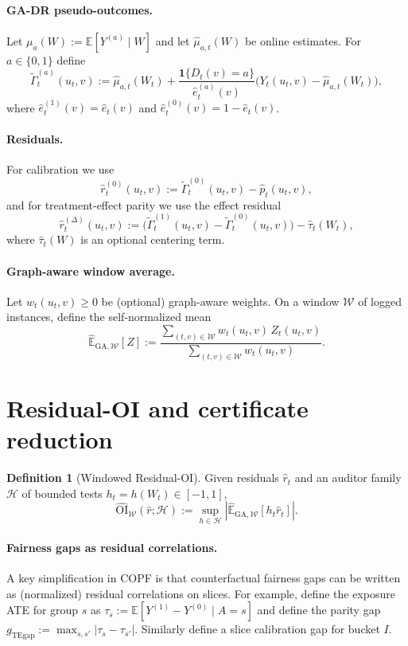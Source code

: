 \documentclass[11pt]{article}
\newcommand{\E}{\mathbb{E}}
\newcommand{\1}{\mathbf{1}}
\newcommand{\cH}{\mathcal{H}}
\newcommand{\cW}{\mathcal{W}}
\newcommand{\abs}[1]{\left|#1\right|}
\newcommand{\Eb}{\widehat{\mathbb{E}}} %
\newcommand{\tGADR}{\widetilde{\Gamma}}
\theoremstyle{plain}
\theoremstyle{definition}
\newtheorem{definition}[theorem]{Definition}
\theoremstyle{remark}
\begin{document}
\paragraph{GA-DR pseudo-outcomes.}
Let $\mu_a(W):=\E[Y^{(a)}\mid W]$ and let $\hat\mu_{a,t}(W)$ be online estimates.
For $a\in\{0,1\}$ define
\begin{equation}
\label{eq:gadr}
\tGADR_t^{(a)}(u_t,v)
:=\hat\mu_{a,t}(W_t)
+\frac{\1\{D_t(v)=a\}}{\hat e_t^{(a)}(v)}\bigl(Y_t(u_t,v)-\hat\mu_{a,t}(W_t)\bigr),
\end{equation}
where $\hat e_t^{(1)}(v)=\hat e_t(v)$ and $\hat e_t^{(0)}(v)=1-\hat e_t(v)$.

\paragraph{Residuals.}
For calibration we use
\[\hat r_t^{(0)}(u_t,v):=\tGADR_t^{(0)}(u_t,v)-\hat p_t(u_t,v),\]
and for treatment-effect parity we use the effect residual
\[\hat r_t^{(\Delta)}(u_t,v):=\bigl(\tGADR_t^{(1)}(u_t,v)-\tGADR_t^{(0)}(u_t,v)\bigr)-\hat\tau_t(W_t),\]
where $\hat\tau_t(W)$ is an optional centering term.

\paragraph{Graph-aware window average.}
Let $w_t(u_t,v)\ge 0$ be (optional) graph-aware weights.
On a window $\cW$ of logged instances, define the self-normalized mean
\[
\Eb_{\mathrm{GA},\cW}[Z] :=
\frac{\sum_{(t,v)\in\cW} w_t(u_t,v)\,Z_t(u_t,v)}{\sum_{(t,v)\in\cW} w_t(u_t,v)}.
\]

\section{Residual-OI and certificate reduction}
\label{sec:cert}

\begin{definition}[Windowed Residual-OI]\label{def:oi}
Given residuals $\hat r_t$ and an auditor family $\cH$ of bounded tests $h_t=h(W_t)\in[-1,1]$,
\[
\widehat{\mathrm{OI}}_{\cW}(\hat r;\cH) := \sup_{h\in\cH}\abs{\Eb_{\mathrm{GA},\cW}[h_t\hat r_t]}.
\]
\end{definition}

\paragraph{Fairness gaps as residual correlations.}
A key simplification in COPF is that counterfactual fairness gaps can be written as
(normalized) residual correlations on slices.
For example, define the exposure ATE for group $s$ as
$\tau_s := \E[Y^{(1)}-Y^{(0)}\mid A=s]$ and define the parity gap
$g_{\mathrm{TEgap}}:=\max_{s,s'}\abs{\tau_s-\tau_{s'}}$.
Similarly define a slice calibration gap for bucket $I$.
\end{document}

